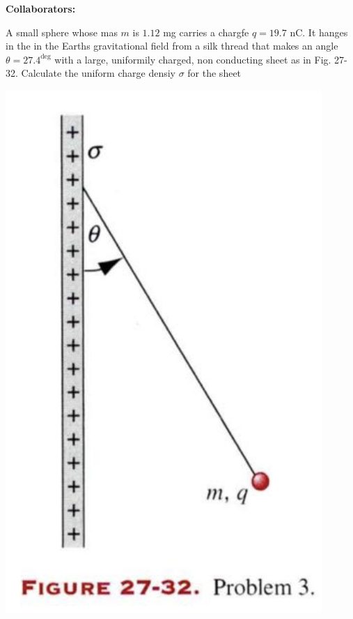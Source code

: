 \documentclass[11pt,letterpaper,boxed]{hmcpset}
\begin{document}
\noindent\textbf{Collaborators:} 


\begin{problem}
A small sphere whose mas $m$ is $1.12$ mg carries a chargfe $q = 19.7$ nC. It hanges in the in the Earths gravitational field from a silk thread that makes an angle $\theta = 27.4^{\deg}$ with a large, uniformily charged, non conducting sheet as in Fig. 27-32. Calculate the uniform charge densiy $\sigma$ for the sheet
\begin{center}
\includegraphics[scale=0.6]{27-32.png}
\end{center} 
\end{problem}
\end{document}
